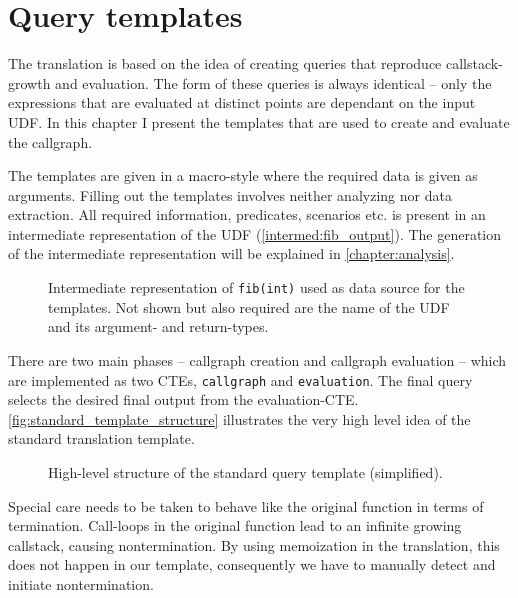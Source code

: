 \chapter{Query templates}\label{chapter:templates}



The translation is based on the idea of creating queries that reproduce callstack-growth and evaluation. The form of these queries is always identical -- only the expressions that are evaluated at distinct points are dependant on the input UDF. In this chapter I present the templates that are used to create and evaluate the callgraph.

The templates are given in a macro-style where the required data is given as arguments. Filling out the templates involves neither analyzing nor data extraction. All required information, predicates, scenarios etc. is present in an intermediate representation of the UDF (\autoref{intermed:fib_output}). The generation of the intermediate representation will be explained in \autoref{chapter:analysis}.

\begin{figure}[h!]
    \centering\small
    
    \caption{Intermediate representation of \texttt{fib(int)} used as data source for the templates. Not shown but also required are the name of the UDF and its argument- and return-types.}
    \label{intermed:fib_output}
\end{figure}



There are two main phases -- callgraph creation and callgraph evaluation -- which are implemented as two CTEs, \texttt{callgraph} and \texttt{evaluation}. The final query selects the desired final output from the evaluation-CTE. \autoref{fig:standard_template_structure} illustrates the very high level idea of the standard translation template.

\begin{figure}[h!]
    \centering
    \caption{High-level structure of the standard query template (simplified).}
    \label{fig:standard_template_structure}
\end{figure}

Special care needs to be taken to behave like the original function in terms of termination. Call-loops in the original function lead to an infinite growing callstack, causing nontermination. By using memoization in the translation, this does not happen in our template, consequently we have to manually detect and initiate nontermination.

